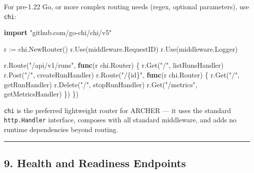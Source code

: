 \documentclass[
]{article}
\newenvironment{Shaded}{}{}
\newcommand{\KeywordTok}[1]{\textcolor[rgb]{0.00,0.44,0.13}{\textbf{#1}}}
\newcommand{\NormalTok}[1]{#1}
\newcommand{\OperatorTok}[1]{\textcolor[rgb]{0.40,0.40,0.40}{#1}}
\newcommand{\StringTok}[1]{\textcolor[rgb]{0.25,0.44,0.63}{#1}}
\begin{document}
For pre-1.22 Go, or more complex routing needs (regex, optional
parameters), use \texttt{chi}:

\begin{Shaded}
\begin{Highlighting}[]
\KeywordTok{import} \StringTok{"github.com/go{-}chi/chi/v5"}

\NormalTok{r }\OperatorTok{:=}\NormalTok{ chi}\OperatorTok{.}\NormalTok{NewRouter}\OperatorTok{()}
\NormalTok{r}\OperatorTok{.}\NormalTok{Use}\OperatorTok{(}\NormalTok{middleware}\OperatorTok{.}\NormalTok{RequestID}\OperatorTok{)}
\NormalTok{r}\OperatorTok{.}\NormalTok{Use}\OperatorTok{(}\NormalTok{middleware}\OperatorTok{.}\NormalTok{Logger}\OperatorTok{)}

\NormalTok{r}\OperatorTok{.}\NormalTok{Route}\OperatorTok{(}\StringTok{"/api/v1/runs"}\OperatorTok{,} \KeywordTok{func}\OperatorTok{(}\NormalTok{r chi}\OperatorTok{.}\NormalTok{Router}\OperatorTok{)} \OperatorTok{\{}
\NormalTok{    r}\OperatorTok{.}\NormalTok{Get}\OperatorTok{(}\StringTok{"/"}\OperatorTok{,}\NormalTok{ listRunsHandler}\OperatorTok{)}
\NormalTok{    r}\OperatorTok{.}\NormalTok{Post}\OperatorTok{(}\StringTok{"/"}\OperatorTok{,}\NormalTok{ createRunHandler}\OperatorTok{)}
\NormalTok{    r}\OperatorTok{.}\NormalTok{Route}\OperatorTok{(}\StringTok{"/\{id\}"}\OperatorTok{,} \KeywordTok{func}\OperatorTok{(}\NormalTok{r chi}\OperatorTok{.}\NormalTok{Router}\OperatorTok{)} \OperatorTok{\{}
\NormalTok{        r}\OperatorTok{.}\NormalTok{Get}\OperatorTok{(}\StringTok{"/"}\OperatorTok{,}\NormalTok{ getRunHandler}\OperatorTok{)}
\NormalTok{        r}\OperatorTok{.}\NormalTok{Delete}\OperatorTok{(}\StringTok{"/"}\OperatorTok{,}\NormalTok{ stopRunHandler}\OperatorTok{)}
\NormalTok{        r}\OperatorTok{.}\NormalTok{Get}\OperatorTok{(}\StringTok{"/metrics"}\OperatorTok{,}\NormalTok{ getMetricsHandler}\OperatorTok{)}
    \OperatorTok{\})}
\OperatorTok{\})}
\end{Highlighting}
\end{Shaded}

\texttt{chi} is the preferred lightweight router for ARCHER --- it uses
the standard \texttt{http.Handler} interface, composes with all standard
middleware, and adds no runtime dependencies beyond routing.

\begin{center}\rule{0.5\linewidth}{0.5pt}\end{center}

\hypertarget{health-and-readiness-endpoints}{%
\subsection{9. Health and Readiness
Endpoints}\label{health-and-readiness-endpoints}}
\end{document}
